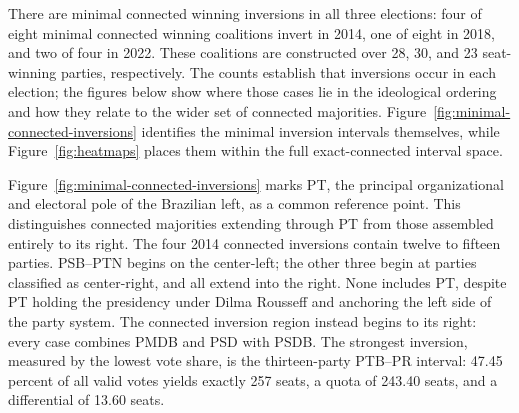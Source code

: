 \documentclass[11pt]{article}
\begin{document}
There are minimal connected winning inversions in all three elections:
four of eight minimal connected winning coalitions invert in 2014, one
of eight in 2018, and two of four in 2022. These coalitions are
constructed over 28, 30, and 23 seat-winning parties, respectively.
The counts establish that inversions occur in each election; the figures
below show where those cases lie in the ideological ordering and how
they relate to the wider set of connected majorities. Figure~\ref{fig:minimal-connected-inversions}
identifies the minimal inversion intervals themselves, while
Figure~\ref{fig:heatmaps} places them within the full exact-connected
interval space.

Figure~\ref{fig:minimal-connected-inversions} marks PT, the principal
organizational and electoral pole of the Brazilian left, as a common reference
point. This distinguishes connected majorities extending through PT from those
assembled entirely to its right. The four 2014 connected inversions contain
twelve to fifteen parties. PSB--PTN begins on the center-left; the other three
begin at parties classified as center-right, and all extend into the right. None
includes PT, despite PT holding the presidency under Dilma Rousseff and
anchoring the left side of the party system. The connected inversion region
instead begins to its right: every case combines PMDB and PSD with PSDB. The
strongest inversion, measured by the lowest vote share, is the thirteen-party
PTB--PR interval: 47.45 percent of all valid votes yields exactly 257 seats, a
quota of 243.40 seats, and a differential of 13.60 seats.
\end{document}
